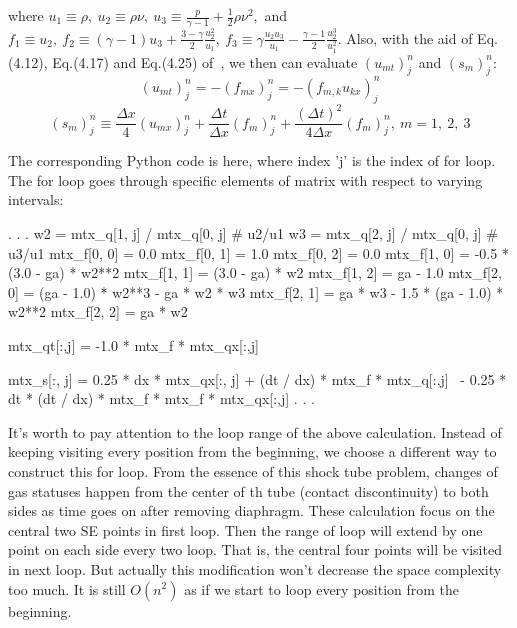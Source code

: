 \documentclass[a4paper,12pt,dvips]{article}
\begin{document}
where $u_{1}\equiv\rho,~u_{2}\equiv\rho\nu,~u_{3}\equiv\frac{p}{\gamma -1}
+\frac{1}{2}\rho\nu^{2},$ \newline
and $f_{1}\equiv u_{2},~f_{2}\equiv(\gamma -1)u_{3}+\frac{3-\gamma}{2}
\frac{u^{2}_{2}}{u_{1}},~f_{3}\equiv\gamma\frac{u_{2}u_{3}}{u_{1}}
-\frac{\gamma -1}{2}\frac{u^{3}_{2}}{u^{2}_{1}}$. \newline
Also, with the aid of Eq.(4.12), Eq.(4.17) and Eq.(4.25) 
of~\cite{CESE_Shin_Chung_Chang_1995}, we then can evaluate $(u_{mt})^{n}_{j}$ 
and $(s_{m})^{n}_{j}$:
\begin{equation}
(u_{mt})^{n}_{j} = -(f_{mx})^{n}_{j} = -(f_{m,k}u_{kx})^{n}_{j}
\end{equation}
\begin{equation}
(s_{m})^{n}_{j}\equiv\frac{\Delta x}{4}(u_{mx})^{n}_{j}+\frac{\Delta t}
{\Delta x}(f_{m})^{n}_{j}+\frac{(\Delta t)^{2}}{4\Delta x}(f_{m})^{n}_{j}
,~m=1,~2,~3
\end{equation}

The corresponding Python code is here, where index 'j' is the index of for loop. 
The for loop goes through specific elements of matrix with respect to varying 
intervals:
\begin{pythonNoIndex}
                            .
                            .
                            .
        w2 = mtx_q[1, j] / mtx_q[0, j]  # u2/u1
        w3 = mtx_q[2, j] / mtx_q[0, j]  # u3/u1
        mtx_f[0, 0] = 0.0
        mtx_f[0, 1] = 1.0
        mtx_f[0, 2] = 0.0
        mtx_f[1, 0] = -0.5 * (3.0 - ga) * w2**2
        mtx_f[1, 1] = (3.0 - ga) * w2
        mtx_f[1, 2] = ga - 1.0
        mtx_f[2, 0] = (ga - 1.0) * w2**3 - ga * w2 * w3
        mtx_f[2, 1] = ga * w3 - 1.5 * (ga - 1.0) * w2**2 
        mtx_f[2, 2] = ga * w2

        mtx_qt[:,j] = -1.0 * mtx_f * mtx_qx[:,j]

        mtx_s[:, j] = 0.25 * dx * mtx_qx[:, j] + (dt / dx) * mtx_f * mtx_q[:,j] \
                          - 0.25 * dt * (dt / dx) * mtx_f * mtx_f * mtx_qx[:,j]
                            .
                            .
                            .
\end{pythonNoIndex}

It's worth to pay attention to the loop range of the above calculation. 
Instead of keeping visiting every position from the beginning, we choose a 
different way to construct this for loop. From the essence of this shock tube 
problem, changes of gas statuses happen from the center of th tube (contact 
discontinuity) to both sides as time goes on after removing diaphragm. 
These calculation focus on the central two SE points in first loop. Then the 
range of loop will extend by one point on each side every two loop. That is, 
the central four points will be visited in next loop. But actually this 
modification won't decrease the space complexity too much. It is still 
$O(n^{2})$ as if we start to loop every position from the beginning.
\end{document}
